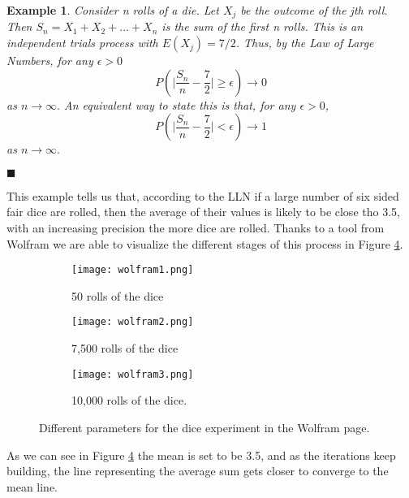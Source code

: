 \documentclass{article}
\newtheorem{example}{Example}
\begin{document}
\begin{example}
\label{die}
Consider n rolls of a die. Let $X_j$ be the outcome of the jth roll. Then $S_n  = X_1 + X_2 + ... + X_n$ is the sum of the first n rolls. This is an independent trials process with $E(X_j) = 7/2$. Thus, by the Law of Large Numbers, for any $\epsilon > 0$
\[P \left( \Bigr \lvert \frac{S_n}{n} - \frac{7}{2} \Bigr \rvert \geq \epsilon \right) \rightarrow 0\]
as $n \rightarrow \infty.$ An equivalent way to state this is that, for any $\epsilon > 0$,
\[P \left( \Bigr \lvert \frac{S_n}{n} - \frac{7}{2} \Bigr \rvert < \epsilon \right) \rightarrow 1\]
as $n \rightarrow \infty.$
\end{example}
\begin{flushright}
$\blacksquare$
\end{flushright}

This example tells us that, according to the LLN if a large number of six sided fair dice are rolled, then the average of their values is likely to be close tho 3.5, with an increasing precision the more dice are rolled. Thanks to a tool from Wolfram we are able to visualize the different stages of this process in Figure \ref{fig1}.\\

\begin{figure}[]
\begin{subfigure}{.5\textwidth}
  \centering
  \texttt{[image: wolfram1.png]}  
  \caption{50 rolls of the dice}
  \label{sb1-1}
\end{subfigure}\hspace{5mm}%
\begin{subfigure}{.5\textwidth}
  \centering
  \texttt{[image: wolfram2.png]}  
  \caption{7,500 rolls of the dice}
  \label{sb1-2}
\end{subfigure}\hspace{5mm}%
\newline
\begin{subfigure}{1\textwidth}
  \centering
  \texttt{[image: wolfram3.png]}  
  \caption{10,000 rolls of the dice.}
  \label{sb1-3}
\end{subfigure}
	\caption{Different parameters for the dice experiment in the Wolfram page.}
\label{fig1}
\end{figure}

As we can see in Figure \ref{fig1} the mean is set to be 3.5, and as the iterations keep building, the line representing the average sum gets closer to converge to the mean line.\\
\end{document}
